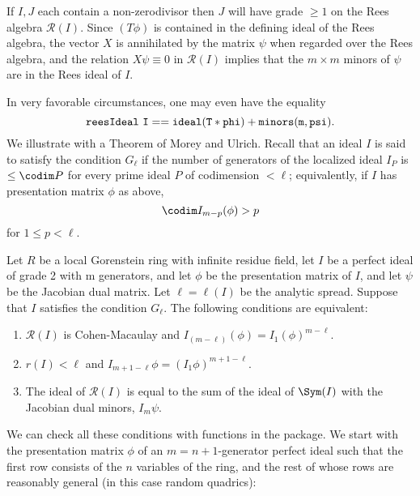 \documentclass[twoside,12pt, leqno]{amsart}
\def\RR{{\mathcal R}}
\begin{document}
     If $I,J$ each contain a non-zerodivisor then
     $J$ will have grade $\geq 1$ on the Rees algebra $\RR(I)$. Since $(T\phi)$ is contained in the
     defining ideal of the Rees algebra, the vector $X$ is annihilated by the matrix
     $\psi$ when regarded over the Rees algebra, and the relation
     $X\psi \equiv 0$ in $\RR(I)$ implies that the $m\times m$ minors of $\psi$ are
     in the Rees ideal of $I$. 
     
     In very favorable circumstances,
     one may even have the equality
     $$ 
     {\tt reesIdeal\ I == ideal(T*phi)+minors(m, psi)}.
     $$ We illustrate with a Theorem of
     Morey and Ulrich. Recall that an ideal $I$ is said to satisfy the condition
     $G_{\ell}$ if the number of generators of the localized ideal $I_{P}$ is $\leq \codim P$
     for every prime ideal $P$ of codimension $<\ell$; equivalently, if $I$ has  presentation
      matrix $\phi$ as above, 
     $$
     \codim I_{m-p}(\phi)>p
     $$
     for $1\leq p < \ell$.
     
     
\begin{theorem}[\cite{MU}]
    Let $R$ be a local Gorenstein ring with infinite residue field, let $I$ be a perfect ideal
     of grade 2 with m generators, and let $\phi$ be the presentation matrix of $I$,
     and let $\psi$ be the Jacobian dual matrix. Let
     $\ell = \ell(I)$ be the analytic spread. Suppose that
     $I$ satisfies the condition $G_{\ell}$. The following conditions are equivalent:
 
\begin{enumerate}
     \item $\RR(I)$ is Cohen-Macaulay and $I_{(m-\ell)}(\phi) = I_1(\phi)^{m-\ell}$.
     \item $r(I) < \ell$ and $I_{m+1-\ell}\phi = (I_1\phi)^{m+1-\ell}$.
     \item The ideal of $\RR(I)$ is equal to the sum of the ideal
     of $\Sym(I)$ with the Jacobian dual minors, $I_{m}\psi$.
\end{enumerate}
    
\end{theorem}

We can check all these conditions with functions in the package.      
     We start with the presentation matrix $\phi$ of an $m = n+1$-generator perfect ideal
     such that the first row consists of the $n$
     variables of the ring, and the rest of whose rows are reasonably general (in this
     case random quadrics):
\end{document}
